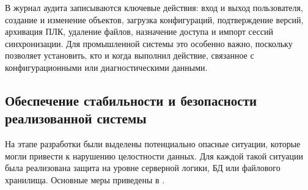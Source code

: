 В журнал аудита записываются ключевые действия: вход и выход пользователя, создание и изменение объектов, загрузка конфигураций, подтверждение версий, архивация ПЛК, удаление файлов, назначение доступа и импорт сессий синхронизации. Для промышленной системы это особенно важно, поскольку позволяет установить, кто и когда выполнил действие, связанное с конфигурационными или диагностическими данными.


\subsection{Обеспечение стабильности и безопасности реализованной системы}

На этапе разработки были выделены потенциально опасные ситуации, которые могли привести к нарушению целостности данных. Для каждой такой ситуации была реализована защита на уровне серверной логики, БД или файлового хранилища. Основные меры приведены в .

